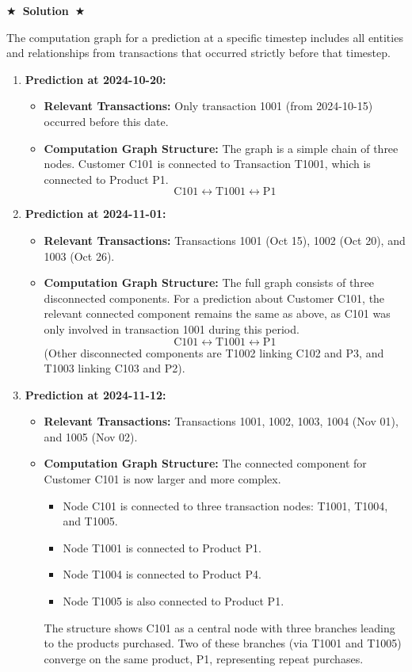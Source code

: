 \documentclass{article}
\numberwithin{figure}{section}
\newcommand{\Solution}[1]{%
    {%
        \medskip
        \color{red}
        \bf $\bigstar$~\sf\textbf{Solution}~$\bigstar$ \sf
        #1
    }
    \bigskip
}
\begin{document}
\Solution{
	The computation graph for a prediction at a specific timestep includes all entities and relationships from transactions that occurred strictly before that timestep.
	
	\begin{enumerate}
		\item \textbf{Prediction at 2024-10-20:}
		\begin{itemize}
			\item \textbf{Relevant Transactions:} Only transaction 1001 (from 2024-10-15) occurred before this date.
			\item \textbf{Computation Graph Structure:} The graph is a simple chain of three nodes. Customer C101 is connected to Transaction T1001, which is connected to Product P1.
			\[ \text{C101} \longleftrightarrow \text{T1001} \longleftrightarrow \text{P1} \]
		\end{itemize}
		
		\item \textbf{Prediction at 2024-11-01:}
		\begin{itemize}
			\item \textbf{Relevant Transactions:} Transactions 1001 (Oct 15), 1002 (Oct 20), and 1003 (Oct 26).
			\item \textbf{Computation Graph Structure:} The full graph consists of three disconnected components. For a prediction about Customer C101, the relevant connected component remains the same as above, as C101 was only involved in transaction 1001 during this period.
			\[ \text{C101} \longleftrightarrow \text{T1001} \longleftrightarrow \text{P1} \]
			(Other disconnected components are T1002 linking C102 and P3, and T1003 linking C103 and P2).
		\end{itemize}
		
		\item \textbf{Prediction at 2024-11-12:}
		\begin{itemize}
			\item \textbf{Relevant Transactions:} Transactions 1001, 1002, 1003, 1004 (Nov 01), and 1005 (Nov 02).
			\item \textbf{Computation Graph Structure:} The connected component for Customer C101 is now larger and more complex.
			\begin{itemize}
				\item Node C101 is connected to three transaction nodes: T1001, T1004, and T1005.
				\item Node T1001 is connected to Product P1.
				\item Node T1004 is connected to Product P4.
				\item Node T1005 is also connected to Product P1.
			\end{itemize}
			The structure shows C101 as a central node with three branches leading to the products purchased. Two of these branches (via T1001 and T1005) converge on the same product, P1, representing repeat purchases.
		\end{itemize}
	\end{enumerate}
}
\end{document}
